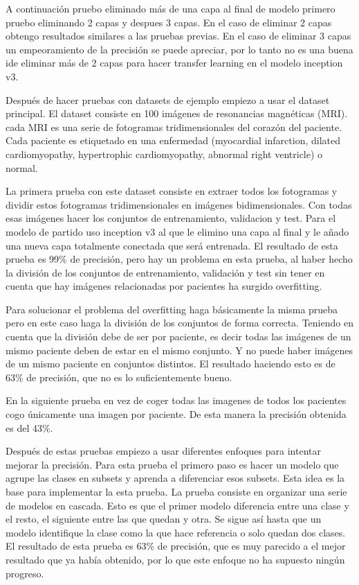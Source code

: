 \documentclass[12pt,a4paper]{article}
\begin{document}
A continuación pruebo eliminado más de una capa al final de modelo primero pruebo eliminando 2 capas y despues 3 capas. En el caso de eliminar 2 capas obtengo resultados similares a las pruebas previas. En el caso de eliminar 3 capas un empeoramiento de la precisión se puede apreciar, por lo tanto no es una buena ide eliminar más de 2 capas para hacer transfer learning en el modelo inception v3.
\bigskip

Después de hacer pruebas con datasets de ejemplo empiezo a usar el dataset principal. El dataset consiste en 100 imágenes de resonancias magnéticas (MRI). cada MRI es una serie de fotogramas tridimensionales del corazón del paciente. Cada paciente es etiquetado en una enfermedad (myocardial infarction, dilated cardiomyopathy, hypertrophic cardiomyopathy, abnormal right ventricle) o normal.
\bigskip

La primera prueba con este dataset consiste en extraer todos los fotogramas y dividir estos fotogramas tridimensionales en imágenes bidimensionales. Con todas esas imágenes hacer los conjuntos de entrenamiento, validacion y test. Para el modelo de partido uso inception v3 al que le elimino una capa al final y le añado una nueva capa totalmente conectada que será entrenada. El resultado de esta prueba es 99\% de precisión, pero hay un problema en esta prueba, al haber hecho la división de los conjuntos de entrenamiento, validación y test sin tener en cuenta que hay imágenes relacionadas por pacientes ha surgido overfitting.
\bigskip

Para solucionar el problema del overfitting haga básicamente la misma prueba pero en este caso haga la división de los conjuntos de forma correcta. Teniendo en cuenta que la división debe de ser por paciente, es decir todas las imágenes de un mismo paciente deben de estar en el mismo conjunto. Y no puede haber imágenes de un mismo paciente en conjuntos distintos. El resultado haciendo esto es de 63\% de precisión, que no es lo suficientemente bueno.
\bigskip

En la siguiente prueba en vez de coger todas las imagenes de todos los pacientes cogo únicamente una imagen por paciente. De esta manera la precisión obtenida es del 43\%.
\bigskip

Después de estas pruebas empiezo a usar diferentes enfoques para intentar mejorar la precisión. Para esta prueba el primero paso es hacer un modelo que agrupe las clases en subsets y aprenda a diferenciar esos subsets. Esta idea es la base para implementar la esta prueba. La prueba consiste en organizar una serie de modelos en cascada. Esto es que el primer modelo diferencia entre una clase y el resto, el siguiente entre las que quedan y otra. Se sigue así hasta que un modelo identifique la clase como la que hace referencia o solo quedan dos clases. El resultado de esta prueba es 63\% de precisión, que es muy parecido a el mejor resultado que ya había obtenido, por lo que este enfoque no ha supuesto ningún progreso.
\bigskip
\end{document}
